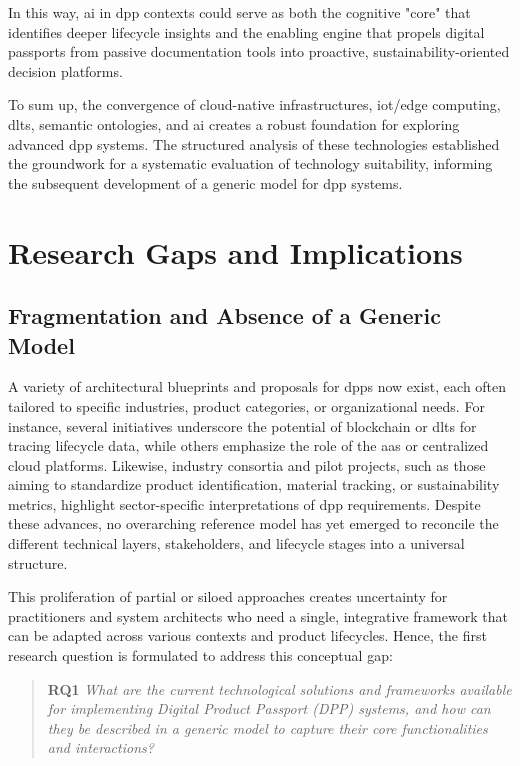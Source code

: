 In this way, \ac{ai} in \ac{dpp} contexts could serve as both the cognitive "core" that identifies deeper lifecycle insights and the enabling engine that propels digital passports from passive documentation tools into proactive, sustainability-oriented decision platforms.

To sum up, the convergence of cloud-native infrastructures, \ac{iot}/edge computing, \ac{dlt}s, semantic ontologies, and \ac{ai} creates a robust foundation for exploring advanced \ac{dpp} systems. The structured analysis of these technologies established the groundwork for a systematic evaluation of technology suitability, informing the subsequent development of a generic model for \ac{dpp} systems.

\section{Research Gaps and Implications}
\label{sec:research_gaps}

\subsection*{Fragmentation and Absence of a Generic Model}
A variety of architectural blueprints and proposals for \ac{dpp}s now exist, each often tailored to specific industries, product categories, or organizational needs. For instance, several initiatives underscore the potential of blockchain or \ac{dlt}s for tracing lifecycle data, while others emphasize the role of the \acrlong{aas} or centralized cloud platforms. Likewise, industry consortia and pilot projects, such as those aiming to standardize product identification, material tracking, or sustainability metrics, highlight sector-specific interpretations of \ac{dpp} requirements. Despite these advances, no overarching reference model has yet emerged to reconcile the different technical layers, stakeholders, and lifecycle stages into a universal structure.

This proliferation of partial or siloed approaches creates uncertainty for practitioners and system architects who need a single, integrative framework that can be adapted across various contexts and product lifecycles. Hence, the first research question is formulated to address this conceptual gap:

\begin{quote}
    \textbf{RQ1} \textit{What are the current technological solutions and frameworks available for implementing Digital Product Passport (DPP) systems, and how can they be described in a generic model to capture their core functionalities and interactions?}
\end{quote}

